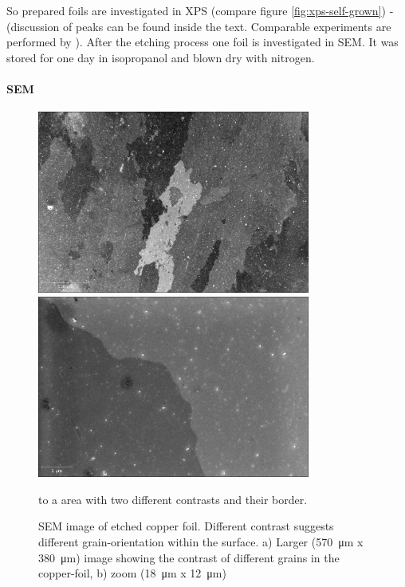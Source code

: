 So prepared foils are investigated in XPS (compare figure \ref{fig:xps-self-grown}) - (discussion of peaks can be found inside the text. Comparable experiments  are performed by \cite[8]{stables_report_2008}).
After the etching process one foil is investigated in SEM. It was stored for one day in isopropanol and blown dry with nitrogen. 

\paragraph{SEM}
\label{sec:foil-SEM}


\begin{figure}[]
	\begin{center}
		\includegraphics[height=6cm]{./images/Domenik_16031715.jpg}
		\includegraphics[height=6cm]{./images/Domenik_16031717.jpg}
	\end{center}
	\caption{SEM image of etched copper foil. Different contrast suggests different grain-orientation within the surface. a) Larger (\SI{570}{\micro \meter} x \SI{380}{\micro \meter}) image showing the contrast of different grains in the copper-foil, b) zoom (\SI{18}{\micro \meter} x \SI{12}{\micro \meter})} to a area with two different contrasts and their border.
	\label{fig:SEM-gb}
\end{figure}

